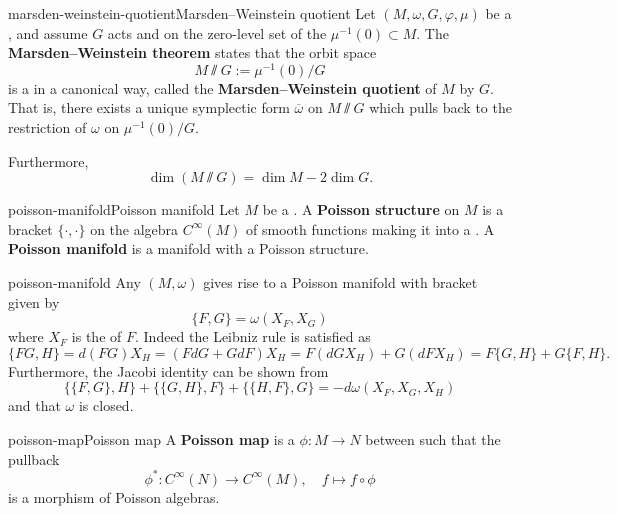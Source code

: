 \begin{topic}{marsden-weinstein-quotient}{Marsden--Weinstein quotient}
    Let $(M, \omega, G, \varphi, \mu)$ be a , and assume $G$ acts  and  on the zero-level set of the  $\mu^{-1}(0) \subset M$. The \textbf{Marsden--Weinstein theorem} states that the orbit space
    \[ M \sslash G := \mu^{-1}(0) / G \]
    is a  in a canonical way, called the \textbf{Marsden--Weinstein quotient} of $M$ by $G$. That is, there exists a unique symplectic form $\overline{\omega}$ on $M \sslash G$ which pulls back to the restriction of $\omega$ on $\mu^{-1}(0) / G$.
    
    Furthermore,
    \[ \dim(M \sslash G) = \dim M - 2 \dim G . \]
\end{topic}

\begin{topic}{poisson-manifold}{Poisson manifold}
    Let $M$ be a . A \textbf{Poisson structure} on $M$ is a bracket $\{ \cdot, \cdot \}$ on the algebra $C^\infty(M)$ of smooth functions making it into a . A \textbf{Poisson manifold} is a manifold with a Poisson structure.
\end{topic}

\begin{example}{poisson-manifold}
    Any  $(M, \omega)$ gives rise to a Poisson manifold with bracket given by
    \[ \{ F, G \} = \omega(X_F, X_G) \]
    where $X_F$ is the  of $F$.
    Indeed the Leibniz rule is satisfied as
    \[ \{ FG, H \} = d(FG) X_H = (F d G + G d F) X_H = F (d G X_H) + G (d F X_H) = F \{ G, H \} + G \{ F, H \} . \]
    Furthermore, the Jacobi identity can be shown from
    \[ \{ \{ F, G \}, H \} + \{ \{ G, H \}, F \} + \{ \{ H, F \}, G \} = -d \omega(X_F, X_G, X_H) \]
    and that $\omega$ is closed.
\end{example}

\begin{topic}{poisson-map}{Poisson map}
    A \textbf{Poisson map} is a  $\phi : M \to N$ between  such that the pullback
    \[ \phi^* : C^\infty(N) \to C^\infty(M), \quad f \mapsto f \circ \phi \]
    is a morphism of Poisson algebras.
\end{topic}

